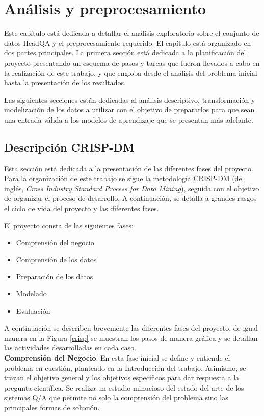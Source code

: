 \chapter{Análisis y preprocesamiento}\label{chapter:methods}

Este capítulo está dedicada a detallar el análisis exploratorio sobre el conjunto de datos HeadQA y el preprocesamiento requerido. El capítulo está organizado en dos partes principales. La primera sección está dedicada a la planificación del proyecto presentando un esquema de pasos y tareas que fueron llevados a cabo en la realización de este trabajo, y que engloba desde el análisis del problema inicial hasta la presentación de los resultados. 

Las siguientes secciones están dedicadas al análisis descriptivo, transformación y modelización de los datos a utilizar con el objetivo de prepararlos para que sean una entrada válida a los modelos de aprendizaje que se presentan más adelante.

\section{Descripción CRISP-DM}

Esta sección está dedicada a la presentación de las diferentes fases del proyecto. Para la organización de este trabajo se sigue la metodología CRISP-DM (del inglés, \textit{Cross Industry Standard Process for Data Mining}), seguida con el objetivo de organizar el proceso de desarrollo. A continuación, se detalla a grandes rasgos el ciclo de vida del proyecto y las diferentes fases. 

El proyecto consta de las siguientes fases:

\begin{itemize}
  \item Comprensión del negocio
  \item Comprensión de los datos
  \item Preparación de los datos
  \item Modelado
  \item Evaluación
\end{itemize}

A continuación se describen brevemente las diferentes fases del proyecto, de igual manera en la Figura \ref{crisp} se muestran los pasos de manera gráfica y se detallan las actividades desarrolladas en cada caso.\\

\textbf{Comprensión del Negocio}: En esta fase inicial se define y entiende el problema en cuestión, planteado en la Introducción del trabajo. Asimismo, se trazan el objetivo general y los objetivos específicos para dar respuesta a la pregunta científica. Se realiza un estudio minucioso del estado del arte de los sistemas Q/A que permite no solo la comprensión del problema sino las principales formas de solución.

